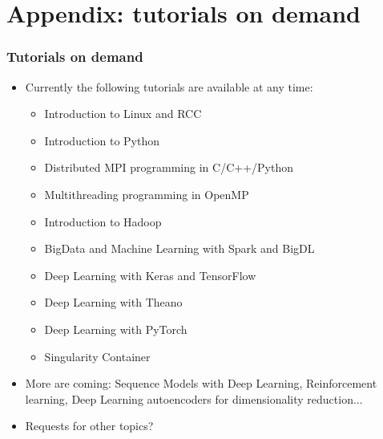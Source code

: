 \section{Appendix: tutorials on demand}
\begin{frame}[fragile]
  \frametitle{Tutorials on demand}
  \begin{itemize}
    \item Currently the following tutorials are available at any time:
      \begin{itemize}
        \item Introduction to Linux and RCC
        \item Introduction to Python
        \item Distributed MPI programming in C/C++/Python
        \item Multithreading programming in OpenMP
        \item Introduction to Hadoop
        \item BigData and Machine Learning with Spark and BigDL
        \item Deep Learning with Keras and TensorFlow
        \item Deep Learning with Theano
        \item Deep Learning with PyTorch
        \item Singularity Container
      \end{itemize}
    \item More are coming: Sequence Models with Deep Learning, Reinforcement learning, Deep Learning autoencoders for dimensionality
      reduction...
    \item Requests for other topics?
  \end{itemize}
\end{frame}
